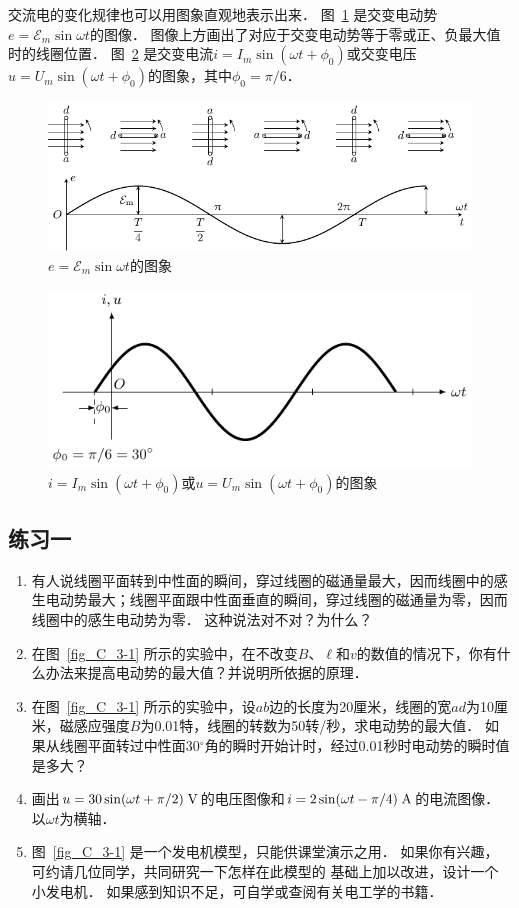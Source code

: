 	
交流电的变化规律也可以用图象直观地表示出来．
图~\ref{fig_C_3-4} 是交变电动势$e=\mathcal{E}_m \sin \omega t$的图像．
图像上方画出了对应于交变电动势等于零或正、负最大值时的线圈位置．
图~\ref{fig_C_3-5} 是交变电流$i=I_m\sin(\omega t+\phi_0)$或交变电压 $u=U_m\sin(\omega t+\phi_0)$的图象，其中$\phi_0=\pi/6$．
\begin{figure}[htbp]
    \centering
    \includegraphics{fig/C/3-4.pdf}
    \caption{$e=\mathcal{E}_m \sin \omega t$的图象}\label{fig_C_3-4}
\end{figure}
\begin{figure}[htbp]
    \centering
    \includegraphics{fig/C/3-5.pdf}
    \caption{$i=I_m\sin(\omega t+\phi_0)$或$u=U_m\sin(\omega t+\phi_0)$的图象}\label{fig_C_3-5}
\end{figure}



\subsection*{练习一}
\begin{enumerate}
    \item 有人说线圈平面转到中性面的瞬间，穿过线圈的磁通量最大，因而线圈中的感生电动势最大；线圈平面跟中性面垂直的瞬间，穿过线圈的磁通量为零，因而线圈中的感生电动势为零．
    这种说法对不对？为什么？
    \item 在图~\ref{fig_C_3-1} 所示的实验中，在不改变$B$、$\ell$和$v$的数值的情况下，你有什么办法来提高电动势的最大值？并说明所依据的原理．
    \item 在图~\ref{fig_C_3-1} 所示的实验中，设$ab$边的长度为20厘米，线圈的宽$ad$为10厘米，磁感应强度$B$为0.01特，线圈的转数为50转/秒，求电动势的最大值．
    如果从线圈平面转过中性面30$^\circ$角的瞬时开始计时，经过0.01秒时电动势的瞬时值是多大？
    \item 画出$u=30\sin(\omega t+\pi/2) \;\text{V} $的电压图像和$i=2\sin(\omega t-\pi/4) \;\text{A} $的电流图像．
    以$\omega t$为横轴．
    \item 图~\ref{fig_C_3-1} 是一个发电机模型，只能供课堂演示之用．
    如果你有兴趣，可约请几位同学，共同研究一下怎样在此模型的	
	基础上加以改进，设计一个小发电机．
	如果感到知识不足，可自学或查阅有关电工学的书籍．
\end{enumerate}


